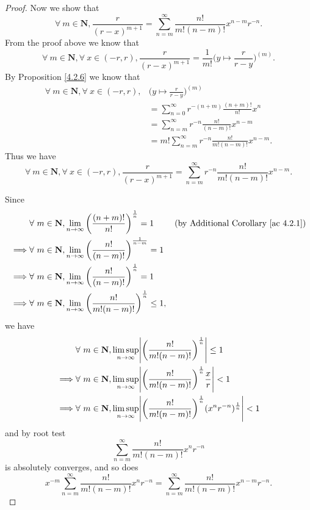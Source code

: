 \begin{proof}
    Now we show that
    \[
        \forall\ m \in \mathbf{N}, \frac{r}{(r - x)^{m + 1}} = \sum_{n = m}^\infty \frac{n!}{m! (n - m)!} x^{n - m} r^{-n}.
    \]
    From the proof above we know that
    \[
        \forall\ m \in \mathbf{N}, \forall\ x \in (-r, r), \frac{r}{(r - x)^{m + 1}} = \frac{1}{m!} \bigg(y \mapsto \frac{r}{r - y}\bigg)^{(m)}.
    \]
    By Proposition \ref{4.2.6} we know that
    \begin{align*}
        \forall\ m \in \mathbf{N}, \forall\ x \in (-r, r), & \bigg(y \mapsto \frac{r}{r - y}\bigg)^{(m)}                       \\
                                                           & = \sum_{n = 0}^\infty r^{-(n + m)} \frac{(n + m)!}{n!} x^n        \\
                                                           & = \sum_{n = m}^\infty r^{-n} \frac{n!}{(n - m)!} x^{n - m}        \\
                                                           & = m! \sum_{n = m}^\infty r^{-n} \frac{n!}{m! (n - m)!} x^{n - m}.
    \end{align*}
    Thus we have
    \[
        \forall\ m \in \mathbf{N}, \forall\ x \in (-r, r), \frac{r}{(r - x)^{m + 1}} = \sum_{n = m}^\infty r^{-n} \frac{n!}{m! (n - m)!} x^{n - m}.
    \]

    Since
    \begin{align*}
                 & \forall\ m \in \mathbf{N}, \lim_{n \to \infty} \bigg(\frac{(n + m)!}{n!}\bigg)^{\frac{1}{n}} = 1        & \text{(by Additional Corollary \ref{ac 4.2.1})} \\
        \implies & \forall\ m \in \mathbf{N}, \lim_{n \to \infty} \bigg(\frac{n!}{(n - m)!}\bigg)^{\frac{1}{n - m}} = 1                                                      \\
        \implies & \forall\ m \in \mathbf{N}, \lim_{n \to \infty} \bigg(\frac{n!}{(n - m)!}\bigg)^{\frac{1}{n}} = 1                                                          \\
        \implies & \forall\ m \in \mathbf{N}, \lim_{n \to \infty} \bigg(\frac{n!}{m! (n - m)!}\bigg)^{\frac{1}{n}} \leq 1,
    \end{align*}
    we have
    \begin{align*}
                 & \forall\ m \in \mathbf{N}, \limsup_{n \to \infty} \abs*{\bigg(\frac{n!}{m! (n - m)!}\bigg)^{\frac{1}{n}}} \leq 1                         \\
        \implies & \forall\ m \in \mathbf{N}, \limsup_{n \to \infty} \abs*{\bigg(\frac{n!}{m! (n - m)!}\bigg)^{\frac{1}{n}} \frac{x}{r}} < 1                \\
        \implies & \forall\ m \in \mathbf{N}, \limsup_{n \to \infty} \abs*{\bigg(\frac{n!}{m! (n - m)!}\bigg)^{\frac{1}{n}} (x^n r^{-n})^{\frac{1}{n}}} < 1
    \end{align*}
    and by root test
    \[
        \sum_{n = m}^\infty \frac{n!}{m! (n - m)!} x^n r^{-n}
    \]
    is absolutely converges, and so does
    \[
        x^{-m} \sum_{n = m}^\infty \frac{n!}{m! (n - m)!} x^n r^{-n} = \sum_{n = m}^\infty \frac{n!}{m! (n - m)!} x^{n - m} r^{-n}.
    \]
\end{proof}

